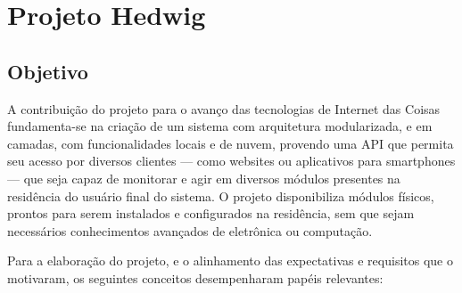 \section{Projeto Hedwig}

\subsection{Objetivo}
A contribuição do projeto para o avanço das tecnologias de Internet das Coisas fundamenta-se na criação de um sistema com arquitetura modularizada, e em camadas, com funcionalidades locais e de nuvem, provendo uma API que permita seu acesso por diversos clientes --- como websites ou aplicativos para smartphones --- que seja capaz de monitorar e agir em diversos módulos presentes na residência do usuário final do sistema. O projeto disponibiliza módulos físicos, prontos para serem instalados e configurados na residência, sem que sejam necessários conhecimentos avançados de eletrônica ou computação.

Para a elaboração do projeto, e o alinhamento das expectativas e requisitos que o motivaram, os seguintes conceitos desempenharam papéis relevantes:

